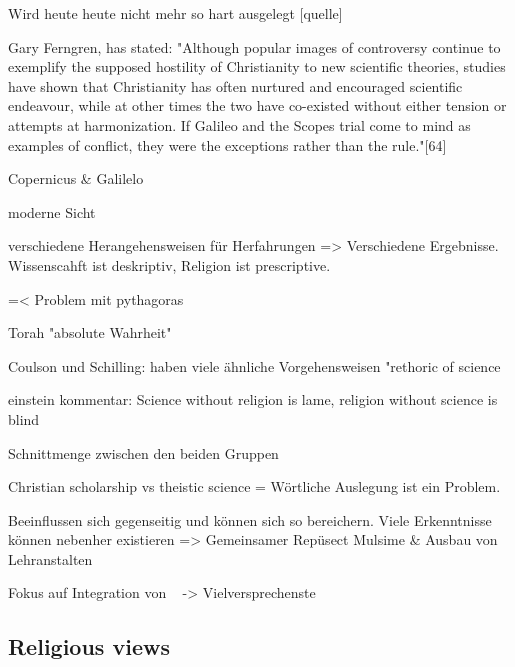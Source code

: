 Wird heute heute nicht mehr so hart ausgelegt [quelle]

Gary Ferngren, has stated: "Although popular images of controversy continue to exemplify the supposed hostility of Christianity to new scientific theories, studies have shown that Christianity has often nurtured and encouraged scientific endeavour, while at other times the two have co-existed without either tension or attempts at harmonization. If Galileo and the Scopes trial come to mind as examples of conflict, they were the exceptions rather than the rule."[64]


Copernicus \& Galilelo


moderne Sicht

verschiedene Herangehensweisen für Herfahrungen => Verschiedene Ergebnisse.
Wissenscahft ist deskriptiv, Religion ist prescriptive.

=< Problem mit pythagoras

Torah "absolute Wahrheit"




Coulson und Schilling: haben viele ähnliche Vorgehensweisen
"rethoric of science

einstein kommentar: Science without religion is lame, religion without science is blind


Schnittmenge zwischen den beiden Gruppen

Christian scholarship vs theistic science = Wörtliche Auslegung ist ein Problem.







Beeinflussen sich gegenseitig und können sich so bereichern. Viele Erkenntnisse können nebenher existieren => Gemeinsamer Repüsect
Mulsime \& Ausbau von Lehranstalten


Fokus auf Integration von \citeauthor{Barbour2002}~\cite{Barbour2002} -> Vielversprechenste



\subsection{Religious views}